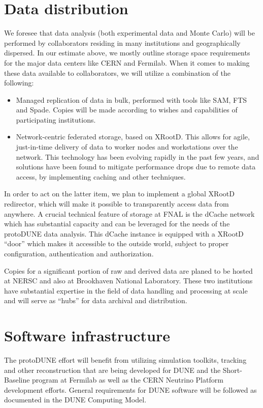 \documentclass[12pt]{article}
\begin{document}
{\section{Data distribution}
We foresee that data analysis (both experimental data and Monte Carlo) will be performed by collaborators residing in many 
institutions and geographically dispersed. In our
estimate above, we mostly outline storage space requirements for the
major data centers like CERN and Fermilab. When it comes to making these data available to collaborators, we will utilize a combination of the following:
\begin{itemize}
\item Managed replication of data in bulk, performed with tools like SAM, FTS and Spade. Copies will be made according to wishes and capabilities of participating institutions.
\item Network-centric federated storage, based on XRootD. This allows for agile, just-in-time delivery of data to worker nodes and workstations over the network. This
technology has been evolving rapidly in the past few years, and solutions have been found to mitigate performance drops due to remote data access, by implementing caching and other techniques.
\end{itemize}

\noindent In order to act on the latter item, we plan to implement a global XRootD redirector, which will make it possible to transparently access data from anywhere.
A crucial technical feature of storage at FNAL is the dCache network which has substantial capacity and can be leveraged
for the needs of the protoDUNE data analysis. This dCache instance is equipped with a XRootD ``door'' which makes it accessible to the outside world, subject
to proper configuration, authentication and authorization.


Copies for a significant portion of raw and derived data are planed to be hosted at NERSC and also at Brookhaven National Laboratory.
These two institutions have substantial expertise  in the field of data handling and processing at scale and will serve as ``hubs'' for data archival and distribution.


\section{Software infrastructure}

The protoDUNE effort will benefit from utilizing simulation toolkits, tracking and other reconstruction
that are being developed for DUNE and the Short-Baseline program at Fermilab as well as the 
CERN Neutrino Platform development efforts. General requirements for DUNE software will be followed
as documented in the DUNE Computing Model.

}
\end{document}
